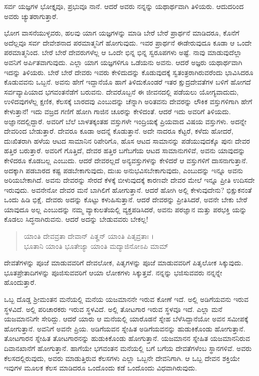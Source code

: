 {\small ಸರ್ವ ಯಜ್ಞಗಳ ಭೋಕ್ತೃವೂ, ಪ್ರಭುವೂ ನಾನೆ. ಆದರೆ ಅವರು ನನ್ನನ್ನು ಯಥಾರ್ಥವಾಗಿ ತಿಳಿಯರು. ಆದುದರಿಂದ ಅವರು ಚ್ಯುತರಾಗುತ್ತಾರೆ.}

ಭೋಗ ವಾಸನೆಯುಳ್ಳವರು, ಹಲವು ಯಾಗ ಯಜ್ಞಗಳನ್ನು ಮಾಡಿ ಬೇರೆ ಬೇರೆ ಪ್ರಾರ್ಥನೆ ಮಾಡಿದರೂ, ಕೊನೆಗೆ ಅದೆಲ್ಲವೂ ಸರ್ವ ದೇವೇಶನಾದ ಪರಮಾತ್ಮನಿಗೆ ಹೋಗುವುದು. ಇವರ ಪ್ರಾರ್ಥನೆ ಈಡೇರುವುದೂ ಕೂಡಾ ಆ ಒಂದೇ ಪರಮಾತ್ಮನಿಂದ. ಬೇರೆ ಬೇರೆ ದೇವರುಗಳೆಲ್ಲ ಆ ಒಂದೇ ಭಿನ್ನ ಭಿನ್ನ ಸ್ವರೂಪಗಳು ಅಷ್ಟೆ. ನಾವು ಮಾಡುವುದೆಲ್ಲಾ ಅವನಿಗೆ ಅರ್ಪಿತವಾಗುವುದು. ಎಲ್ಲಾ ಯಾಗ ಯಜ್ಞಗಳಿಗೂ ಒಡೆಯನು ಅವನು. ಆದರೆ ಅಜ್ಞರು ಯಥಾರ್ಥವಾಗಿ ಇದನ್ನು ತಿಳಿಯರು. ಬೇರೆ ಬೇರೆ ದೇವರು ಇವರು ಕೇಳಿದುದನ್ನು ಕೊಡುವುದಕ್ಕೆ ಸ್ವತಂತ್ರರಾಗಿರುವರೆಂದು ಭಾವಿಸಿದರೂ ಕೊಡುವವನು ಒಬ್ಬನೆ. ಅವನು ಹೇಗೆ ಇದ್ದಾನೆಯೊ ಹಾಗೆ ತಿಳಿದುಕೊಂಡರೆ ಇತರ ಕ್ಷುದ್ರದೇವತೆಗಳ ಬಳಿಗೆ ಹೋಗದೆ ಸರ್ವವ್ಯಾಪಿಯಾದ ಭಗವಂತನೆಡೆಗೆ ಬರುವನು. ದೇವರೊಬ್ಬನೆ ಈ ಜೀವನದಲ್ಲಿ ಪಡೆಯಲು ಯೋಗ್ಯವಾದುದು, ಉಳಿದವುಗಳೆಲ್ಲ ಕ್ಷಣಿಕ, ಕೆಲಸಕ್ಕೆ ಬಾರದವು ಎಂಬುದನ್ನು ಚೆನ್ನಾಗಿ ಅರಿತವನು ದೇವರನ್ನು ಲೌಕಿಕ ವಸ್ತುಗಳಿಗಾಗಿ ಹೇಗೆ ಕೇಳುತ್ತಾನೆ! ಇದು ವಜ್ರದ ಗಣಿಗೆ ಹೋಗಿ ಗಾಜಿನ ಚೂರನ್ನು ಕೇಳಿದಂತೆ. ಆದರೆ ಇದು ಅವರಿಗೆ ತಿಳಿಯದು. ಅಜ್ಞಾನದಲ್ಲಿದ್ದಾರೆ. ಅವರಿಗೆ ಬೆಲೆ ಬಾಳತಕ್ಕಂತಹ ವಸ್ತುಗಳೇ ಇಂದ್ರಿಯಕ್ಕೆ ಪ್ರಿಯವಾದ ವಿಷಯ ವಸ್ತುಗಳು. ಅದನ್ನೇ ದೇವರಿಂದ ಬೇಡುತ್ತಾರೆ. ದೇವರೂ ಕೂಡಾ ಅದನ್ನೆ ಕೊಡುತ್ತಾನೆ. ಅದೇ ನಾದರೂ ಕೆಟ್ಟರೆ, ಕಳೆದು ಹೋದರೆ, ದುಃಖಿತರಾಗಿ ಹಳೆಯ ಆಟದ ಸಾಮಾನಿನ ರಿಪೇರಿಗೊ, ಹೊಸ ಆಟದ ಸಾಮಾನನ್ನು ಪಡೆಯುವುದಕ್ಕೊ ಪುನಃ ದೇವರ ಹತ್ತಿರ ಬರುತ್ತಾರೆ. ಅವರಿಗೆ ಗೊತ್ತಿದೆ, ದೇವರ ಹತ್ತಿರ ಬಗೆಬಗೆಯ ಆಟದ ಸಾಮಾನುಗಳಿವೆ, ಅವನು ಯಾವುದನ್ನು ಕೇಳಿದರೂ ಕೊಡಬಲ್ಲ ಎಂಬುದು. ಆದರೆ ದೇವರಲ್ಲದೆ ಅನ್ಯವಸ್ತುಗಳನ್ನು ಕೇಳಿದರೆ ಆ ವಸ್ತುಗಳಿಗೆ ದಾಸನಾಗುತ್ತಾನೆ. ಅದಕ್ಕಾಗಿ ಪಡಬಾರದ ಕಷ್ಟ ಪಡಬೇಕಾಗುವುದು, ದುಃಖ ಅನುಭವಿಸಬೇಕಾಗುವುದು, ಎಂಬುದನ್ನು ಇನ್ನೂ ಅವನು ಅರಿಯಬೇಕಾಗಿದೆ. ಅವನು ದೇವರನ್ನು ಸೇರದೆ ಕೆಳಕ್ಕೆ ಬೀಳುವುದಕ್ಕೆ ಕಾರಣವೇ ದೇವರ ಮೇಲೆ ಇನ್ನೂ ಪ್ರೀತಿ ಉದಿಸದೇ ಇರುವುದು. ಅವನೇನೋ ದೇವರ ಮನೆ ಬಾಗಿಲಿಗೆ ಹೋಗುತ್ತಾನೆ. ಆದರೆ ಹೋಗಿ ಅಲ್ಲಿ ಕೇಳುವುದೇನು? ಭಿಕ್ಷುಕನಂತೆ ಒಂದು ಹಿಡಿ ಭಿಕ್ಷೆ. ದೇವರು ಅದನ್ನು ಕೊಟ್ಟು ಕಳುಹಿಸುತ್ತಾನೆ. ಆದರೆ ದೇವರನ್ನು ಪ್ರೀತಿಸಿದರೆ, ಅವನೇ ಬೇಕು ಬೇರೆ ಯಾವುದೂ ಅಲ್ಲ ಎಂಬುದನ್ನು ನಮ್ಮ ವ್ಯಾಕುಲತೆಯಲ್ಲಿ ವ್ಯಕ್ತಪಡಿಸಿದರೆ, ಅವನು ಪರಜ್ಞಾನ ಮತ್ತು ಪರಭಕ್ತಿ ಯನ್ನು ಕೊಡಲು ಸಿದ್ಧನಾಗಿರುವನು. ಆದರೆ ಅದನ್ನು ಬೇಡುವವರು ಬೇಕಲ್ಲ!

\begin{verse}
ಯಾಂತಿ ದೇವವ್ರತಾ ದೇವಾನ್ ಪಿತೄನ್ ಯಾಂತಿ ಪಿತೃವ್ರತಾಃ ।\\ಭೂತಾನಿ ಯಾಂತಿ ಭೂತೇಜ್ಯಾ ಯಾಂತಿ ಮದ್ಯಾಜಿನೋಽಪಿ ಮಾಮ್ 
\end{verse}

{\small ದೇವತೆಗಳನ್ನು ಪೂಜೆ ಮಾಡುವವರಿಗೆ ದೇವಲೋಕ, ಪಿತೃಗಳನ್ನು ಪೂಜೆ ಮಾಡುವವರಿಗೆ ಪಿತೃಲೋಕ ಸಿಕ್ಕುವುದು. ಭೂತಪ್ರೇತಾದಿಗಳನ್ನು ಪೂಜಿಸುವವರಿಗೆ ಆಯಾ ಲೋಕಗಳು ಸಿಕ್ಕುತ್ತವೆ. ನನ್ನನ್ನು ಭಜಿಸುವವರು ನನ್ನನ್ನೇ ಹೊಂದುತ್ತಾರೆ.}

ಒಬ್ಬ ದೊಡ್ಡ ಶ್ರೀಮಂತನ ಮನೆಯಲ್ಲಿ ಮನೆಯ ಯಜಮಾನನೇ ಇರುವ ಕೋಣೆ ಇದೆ. ಅಲ್ಲಿ ಅಡಿಗೆಯವನು ಇರುವ ಸ್ಥಳವಿದೆ. ಅಲ್ಲಿ ಪರಿಚಾರಕರು ಇರುವ ಸ್ಥಳವಿದೆ. ಅಲ್ಲಿ ತೋಟಗಾರ ಇರುವ ಸ್ಥಳವೂ ಇದೆ. ಎಲ್ಲಾ ಮನೆ ಯಜಮಾನನಿಗೇ ಸೇರಿದ್ದು. ಆದರೆ ಯಾರು ಆ ಮನೆಯಲ್ಲಿ ಯಾರೊಡನೆ ಸ್ನೇಹ ಬೆಳೆಸಿದ್ದಾನೆಯೋ ಅವನ ಸಮೀಪಕ್ಕೆ ಹೋಗುತ್ತಾನೆ. ಅವನಿಗೆ ಅವನೇ ಪ್ರಿಯ. ಅಡಿಗೆಯವನ ಸ್ನೇಹಿತ ಅಡಿಗೆಯವನನ್ನು ಹುಡುಕಿಕೊಂಡು ಹೋಗುತ್ತಾನೆ. ತೋಟಗಾರನ ಸ್ನೇಹಿತ ತೋಟಗಾರನನ್ನು ಹುಡುಕಿಕೊಂಡು ಹೋಗುತ್ತಾನೆ. ಯಜಮಾನನ ಸ್ನೇಹಿತ ಯಜಮಾನನಿರುವ ದಿವಾನಖಾನೆಗೆ ಹೋಗುತ್ತಾನೆ. ಹಾಗೆಯೇ ಭಗವಂತನ ಮನೆಯಲ್ಲಿ ಬಗೆ ಬಗೆಯ ದೇವತೆಗಳೆಂಬ ಸ್ಥಾನಗಳಿವೆ. ಅವರು ಕೆಲಸದಲ್ಲಿರುವುದು, ಅವರು ಮಾಡುತ್ತಿರುವ ಕೆಲಸಗಳು ಎಲ್ಲಾ ಒಬ್ಬನೇ ದೇವನಿಗಾಗಿ. ಆ ಒಬ್ಬ ದೇವನ ಶಕ್ತಿಯೇ ಇವುಗಳ ಮೂಲಕ ಕೆಲಸ ಮಾಡಿದರೂ ಒಂದೊಂದು ಕಡೆ ಒಂದೊಂದು ವಿಧವಾಗಿರುವುದು. 

